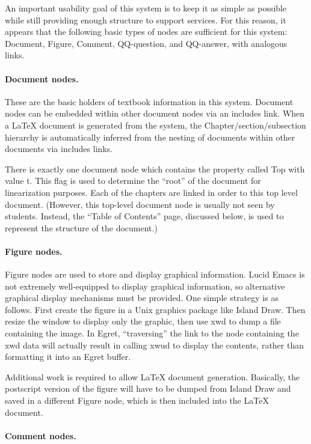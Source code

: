 An important usability goal of this system is to keep it as simple as
possible while still providing enough structure to support services.
For this reason, it appears that the following basic types of nodes
are sufficient for this system: Document, Figure, Comment,
QQ-question, and QQ-answer, with analogous links.

\paragraph {Document nodes.}

These are the basic holders of textbook information in this
system.  Document nodes can be embedded within other document nodes via an
includes link.  When a LaTeX document is generated from the system, the 
Chapter/section/subsection hierarchy is automatically inferred from the 
nesting of documents within other documents via includes links.

There is exactly one document node which contains the property called Top
with value t.  This flag is used to determine the ``root'' of the document
for linearization purposes.  Each of the chapters are linked in order to
this top level document.  (However, this top-level document node is usually
not seen by students.  Instead, the ``Table of Contents'' page, discussed
below, is used to represent the structure of the document.)

\paragraph {Figure nodes.}

Figure nodes are used to store and display graphical information.
Lucid Emacs is not extremely well-equipped to display graphical
information, so alternative graphical display mechanisms must be
provided.  One simple strategy is as follows.  First create the figure
in a Unix graphics package like Island Draw.  Then resize the window
to display only the graphic, then use xwd to dump a file containing
the image.  In Egret, ``traversing'' the link to the node containing
the xwd data will actually result in calling xwud to display the
contents, rather than formatting it into an Egret buffer.

Additional work is required to allow LaTeX document generation.
Basically, the postscript version of the figure will have to be dumped from
Island Draw and saved in a different Figure node, which is then included
into the LaTeX document. 

\paragraph {Comment nodes.}

